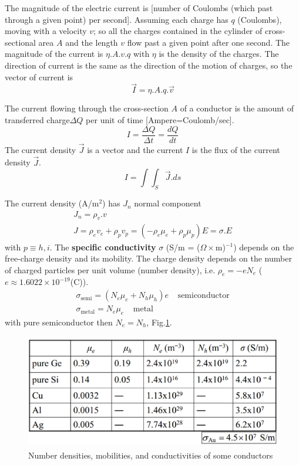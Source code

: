 The magnitude of the electric current is [number of Coulombs (which past through
a given point) per second]. Assuming each charge has $q$ (Coulombs), moving with
a velocity $v$; so all the charges contained in the cylinder of cross-sectional
area $A$ and the length $v$ flow past a given point after one second. The
magnitude of the current is $\eta.A.v.q$ with $\eta$ is the density of the
charges. The direction of current is the same as the direction of the motion of
charges, so the vector of current is
\begin{equation}
\vec{I} = \eta.A.q.\vec{v}
\end{equation}


The current flowing through the cross-section $A$ of a conductor is the amount
of transferred charge$\Delta Q$ per unit of time [Ampere=Coulomb/sec].
\begin{equation}
I = \frac{\Delta Q}{\Delta t} = \frac{dQ}{dt}
\end{equation}
The current density $\vec{J}$ is a vector and the current $I$ is the flux of the
current density $\vec{J}$.
\begin{equation}
I = \int\int_S \vec{J} .ds
\end{equation}

The current density (A/m$^2$) has $J_n$ normal component
\begin{equation}
\begin{split}
J_n = \rho_v . v \\
J = \rho_e v_e + \rho_p v_p = (-\rho_e \mu_e + \rho_p \mu_p) E = \sigma. E
\end{split}
\end{equation}
with $p\equiv h,i$. The {\bf specific conductivity} $\sigma$ (S/m =
($\Omega \times $m)$^{-1}$) depends on the free-charge density and its mobility.
The charge density depends on the number of charged particles per unit volume
(number density), i.e. $\rho_e = -e N_e$ ($e \approx 1.6022\times 10^{-19}$(C)).
\begin{equation}
\begin{split}
\sigma_\text{semi} = ( N_e\mu_e + N_h \mu_h) e \;\;\;\; \text{semiconductor} \\
\sigma_\text{metal} = N_e \mu_e  \;\;\;\; \text{metal}
\end{split}
\end{equation}
with pure semiconductor then $N_e = N_h$, Fig.\ref{fig:specific_conductivity}.

\begin{figure}[hbt]
  \centerline{\includegraphics[height=5cm,
    angle=0]{./images/specific_conductivity.eps}}
  \caption{Number densities, mobilities, and conductivities of some conductors}
  \label{fig:specific_conductivity}
\end{figure}

